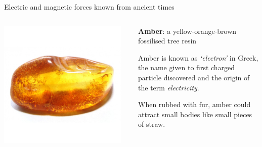 \begin{frame}{Electric and magnetic forces known from ancient times}
\begin{columns}
  \begin{column}{0.20\textwidth}
   \begin{center}
      \includegraphics[width=0.95\textwidth]{./images/photos/amber_stone_1.jpg}\\
   \end{center}
  \end{column}
  \begin{column}{0.80\textwidth}
   \begin{itemize}
   {\small
    \item {\bf Amber}: a yellow-orange-brown fossilised tree resin
     \begin{itemize}
     {\scriptsize
        \item Amber is known as {\em `electron'} in Greek, the name given to first
              charged particle discovered and the origin of the term {\em electricity}.
     }
     \end{itemize}
     \item When rubbed with fur, amber could attract small bodies like small pieces of straw.
   }
   \end{itemize}
  \end{column}
\end{columns}

\vspace{0.2cm}


\end{frame}
